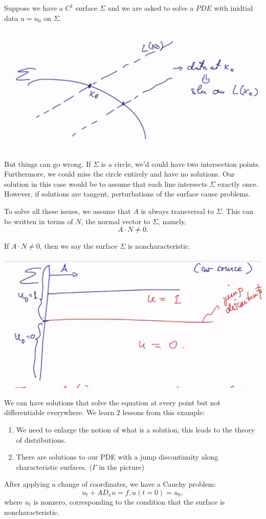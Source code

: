 \documentclass[12pt]{scrartcl}
\begin{document}
Suppose we have a $C^1$ surface $\Sigma$ and we are asked to solve a $PDE$ with inidtial data $u = u_0$
 on $\Sigma$.  
 \begin{center}
\includegraphics[scale=0.5]{sigma.png}
\end{center}
But things can go wrong.  If $\Sigma$ is a circle, we'd could have two intersection points.  Furthermore, we could miss the circle entirely and have no solutions.   Our solution in this case would be to assume that each line intersects $\Sigma$ exactly once.  However, if solutions are tangent, perturbations of the surface cause problems.  

To solve all these issues, we assume that $A$ is always transversal to $\Sigma$.  This can be written in terms of $N$, the normal vector to $\Sigma$, namely,
$$A \cdot N \ne 0.$$
\begin{definition} If $A \cdot N \ne 0$, then we say the surface $\Sigma$ is noncharacteristic.
\end{definition}
 \begin{center}
\includegraphics[scale=0.5]{bad.png}
\end{center}
We can have solutions that solve the equation at every point but not differentiable everywhere.
We learn 2 lessons from this example:
\begin{enumerate}
\item We need to enlarge the notion of what is a solution, this leads to the theory of distributions.
\item There are solutions to our PDE with a jump discontinuity along characteristic surfaces. ($\Gamma$ in the picture)
\end{enumerate}
After applying a change of coordinates, we have a Cauchy problem:
$$u_t + AD_x u = f, u(t=0) = u_0,$$
where $u_t$ is nonzero, corresponding to the condition that the surface is noncharacteristic.
\pagebreak
\end{document}
